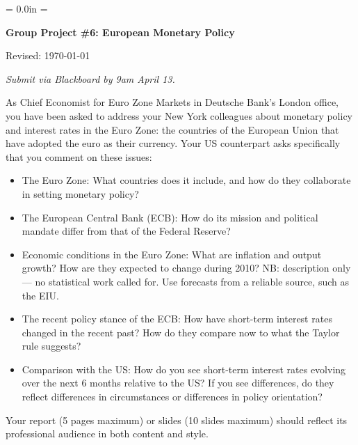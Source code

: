 \documentclass[letterpaper,12pt]{article}
\def\HeadName{Group Project \#6}
\begin{document}
\parindent = 0.0in
\parskip = \bigskipamount
\thispagestyle{empty}%
\Head

\centerline{\large \bf \HeadName:  European Monetary Policy}%
\centerline{Revised:  \today}

\medskip
{\it Submit via Blackboard by 9am April 13.}
\medskip

As Chief Economist for Euro Zone Markets in Deutsche Bank's London office,
you have been asked to address your New York colleagues 
about monetary policy and interest rates in the Euro Zone:
the countries of the European Union that have adopted 
the euro as their currency.  
Your US counterpart asks specifically that you comment on these issues:   
%
\begin{itemize}
\item The Euro Zone:  What countries does it include, 
and how do they collaborate in setting monetary policy?  

\item The European Central Bank (ECB):  How do its mission 
and political mandate differ from that of the Federal Reserve?  

\item Economic conditions in the Euro Zone:   
What are inflation and output growth?
How are they expected to change during 2010?    
NB:  description only --- no statistical work called for.  
Use forecasts from a reliable source, such as the EIU.   

\item The recent policy stance of the ECB:  
How have short-term interest rates changed in the recent past?  
How do they compare now to what the Taylor rule suggests?    
 
\item Comparison with the US:  
How do you see short-term interest rates evolving over the next 6 months relative to the US?
If you see differences, do they reflect differences in 
circumstances or differences in policy orientation?  
\end{itemize}
%
Your report (5 pages maximum) or slides (10 slides maximum)  
should reflect its professional audience in both content and style. 
   
\end{document}

